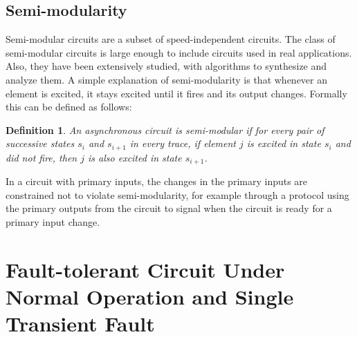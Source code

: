 \documentclass[12pt]{report}
\newtheorem*{definition}{Definition}
\begin{document}
\section{Semi-modularity}
Semi-modular circuits are a subset of speed-independent circuits. 
The class of semi-modular circuits is large enough to include circuits used in real applications.  Also, they have been extensively studied, with algorithms to synthesize and analyze them.  A simple explanation of semi-modularity is that whenever an element is excited, it stays excited until it fires and its output changes.  Formally this can be defined as follows: %
\begin{definition}
An asynchronous circuit is {\em semi-modular} if for every pair of successive states $s_{i}$ and $s_{i+1}$ in every trace, if element $j$ is excited in state $s_i$ and did not fire, then $j$ is also excited in state $s_{i+1}$. 
\end{definition}
In a circuit with primary inputs, the changes in the primary inputs are constrained not to violate semi-modularity, for example through a protocol using the primary outputs from the circuit to signal when the circuit is ready for a primary input change.


\chapter{Fault-tolerant Circuit Under Normal Operation and Single Transient Fault}
\end{document}

